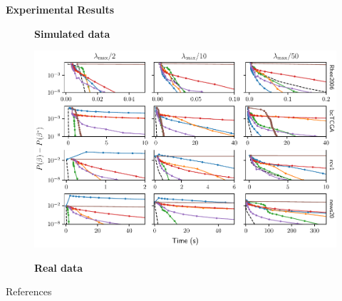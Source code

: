 \documentclass[english,final,t]{beamer}
\begin{document}
\begin{frame}{}
\begin{columns}[t]
\begin{column}{.3\linewidth}
\begin{block}{\textbf{\color{malgared}Experimental Results}}
\begin{figure}[tb]
				\textbf{Simulated data}
			\end{figure}
			\vspace{.5em}

			\begin{figure}[tb]
				\includegraphics[width=0.8\linewidth]{./images/real.pdf}

				\textbf{Real data}
			\end{figure}

			References
			\nocite{*}
			\normalsize
	\end{block}


	\end{column}
\end{columns}
\end{frame}
\end{document}

